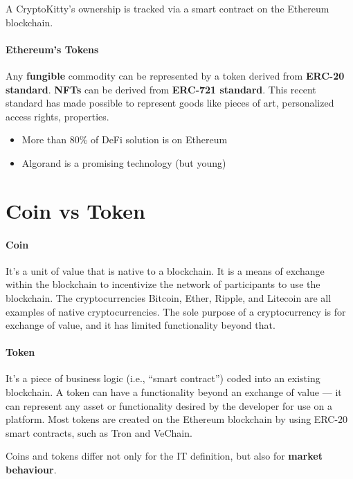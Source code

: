 A CryptoKitty's ownership is tracked via a smart contract on the Ethereum blockchain.

\paragraph{Ethereum's Tokens} Any \textbf{fungible} commodity can be represented by a token derived from \textbf{ERC-20 standard}. \textbf{NFTs} can be derived from \textbf{ERC-721 standard}. This recent standard has made possible to represent goods like pieces of art, personalized access rights, properties.

\begin{itemize}
	\item More than 80\% of DeFi solution is on Ethereum
	\item Algorand is a promising technology (but young)
\end{itemize}



\section{Coin vs Token}

\paragraph{Coin} It's a unit of value that is native to a blockchain. It is a means of exchange within the blockchain to incentivize the network of participants to use the blockchain. The cryptocurrencies Bitcoin, Ether, Ripple, and Litecoin are all examples of native cryptocurrencies. The sole purpose of a cryptocurrency is for exchange of value, and it has limited functionality beyond that.

\paragraph{Token} It's a piece of business logic (i.e., ``smart contract'') coded into an existing blockchain. A token can have a functionality beyond an exchange of value — it can represent any asset or functionality desired by the developer for use on a platform. Most tokens are created on the Ethereum blockchain by using ERC-20 smart contracts, such as Tron and VeChain.

Coins and tokens differ not only for the IT definition, but also for \textbf{market behaviour}.

